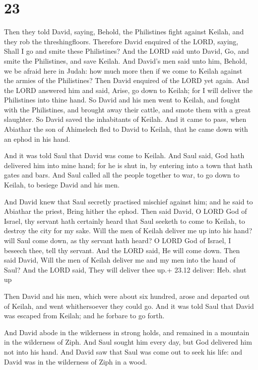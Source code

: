 \hypertarget{section-22}{%
\section{23}\label{section-22}}

 Then they told David, saying, Behold, the Philistines fight
against Keilah, and they rob the threshingfloors.  Therefore
David enquired of the LORD, saying, Shall I go and smite these
Philistines? And the LORD said unto David, Go, and smite the
Philistines, and save Keilah.  And David's men said unto
him, Behold, we be afraid here in Judah: how much more then if we come
to Keilah against the armies of the Philistines?  Then David
enquired of the LORD yet again. And the LORD answered him and said,
Arise, go down to Keilah; for I will deliver the Philistines into thine
hand.  So David and his men went to Keilah, and fought with
the Philistines, and brought away their cattle, and smote them with a
great slaughter. So David saved the inhabitants of Keilah. 
And it came to pass, when Abiathar the son of Ahimelech fled to David to
Keilah, that he came down with an ephod in his hand.

 And it was told Saul that David was come to Keilah. And
Saul said, God hath delivered him into mine hand; for he is shut in, by
entering into a town that hath gates and bars.  And Saul
called all the people together to war, to go down to Keilah, to besiege
David and his men.

 And David knew that Saul secretly practised mischief
against him; and he said to Abiathar the priest, Bring hither the ephod.
 Then said David, O LORD God of Israel, thy servant hath
certainly heard that Saul seeketh to come to Keilah, to destroy the city
for my sake.  Will the men of Keilah deliver me up into his
hand? will Saul come down, as thy servant hath heard? O LORD God of
Israel, I beseech thee, tell thy servant. And the LORD said, He will
come down.  Then said David, Will the men of Keilah deliver
me and my men into the hand of Saul? And the LORD said, They will
deliver thee up.+ 23.12 deliver: Heb. shut up

 Then David and his men, which were about six hundred,
arose and departed out of Keilah, and went whithersoever they could go.
And it was told Saul that David was escaped from Keilah; and he forbare
to go forth.

 And David abode in the wilderness in strong holds, and
remained in a mountain in the wilderness of Ziph. And Saul sought him
every day, but God delivered him not into his hand.  And
David saw that Saul was come out to seek his life: and David was in the
wilderness of Ziph in a wood.

